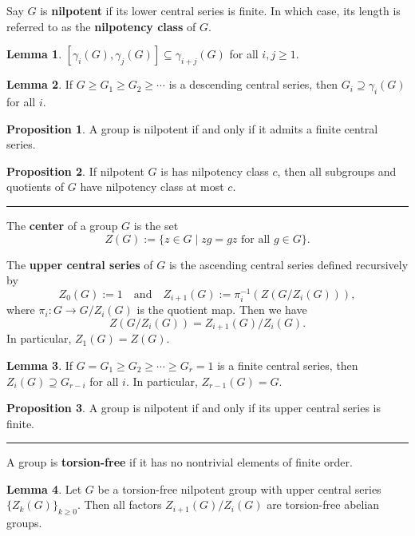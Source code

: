 \documentclass[12pt]{article}
\newcommand{\keyword}[1]{\textbf{#1}}
\newcommand{\sepline}{\rule{\textwidth}{0.4pt}}
\theoremstyle{definition}
\newtheorem{lemma}{Lemma}
\newtheorem{proposition}{Proposition}
\newcommand{\isp}[1]{\quad\text{#1}\quad}
\newcommand{\<}{\left\langle}
\renewcommand{\>}{\right\rangle}
\newcommand{\seq}{\subseteq}
\begin{document}
Say $G$ is \keyword{nilpotent} if its lower central series is finite.
In which case, its length is referred to as the \keyword{nilpotency class} of $G$.

\begin{lemma}
    $[\gamma_i(G), \gamma_j(G)] \seq \gamma_{i + j}(G)$ for all $i, j \geq 1$.
\end{lemma}

\begin{lemma}
    If $G \geq G_1 \geq G_2 \geq \cdots $ is a descending central series, then $G_i \supseteq \gamma_i(G)$ for all $i$.
\end{lemma}

\begin{proposition}
    A group is nilpotent if and only if it admits a finite central series.
\end{proposition}

\begin{proposition}
    If nilpotent $G$ is has nilpotency class $c$, then all subgroups and quotients of $G$ have nilpotency class at most $c$.
\end{proposition}


\sepline

The \keyword{center} of a group $G$ is the set
\[
    Z(G) := \{z \in G \mid zg = gz \text{ for all } g \in G\}.
\]


The \keyword{upper central series} of $G$ is the ascending central series defined recursively by
\[
    Z_0(G) := 1
    \isp{and}
    Z_{i+1}(G) := \pi_i^{-1}(Z(G/Z_i(G))),
\]
where $\pi_i : G \to G/Z_i(G)$ is the quotient map.
Then we have
\[
    Z(G/Z_i(G)) = Z_{i+1}(G)/Z_i(G).
\] 
In particular, $Z_1(G) = Z(G)$.

\begin{lemma}
    If $G = G_1 \geq G_2 \geq \cdots \geq G_r = 1$ is a finite central series, then $Z_i(G) \supseteq G_{r-i}$ for all $i$.
    In particular, $Z_{r-1}(G) = G$.
\end{lemma}

\begin{proposition}
    A group is nilpotent if and only if its upper central series is finite.
\end{proposition}

\sepline

A group is \keyword{torsion-free} if it has no nontrivial elements of finite order.

\begin{lemma}
    Let $G$ be a torsion-free nilpotent group with upper central series $\{Z_k(G)\}_{k \geq 0}$.
    Then all factors $Z_{i+1}(G)/Z_i(G)$ are torsion-free abelian groups.
\end{lemma}
\end{document}

